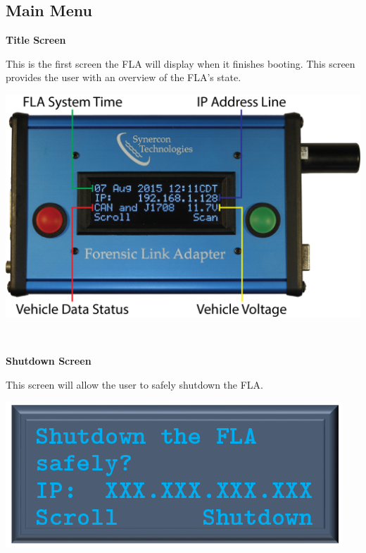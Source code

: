 \documentclass[11pt, oneside]{book}
\begin{document}
\subsection{Main Menu}
\vspace{\baselineskip}
\noindent\begin{minipage}{0.45\textwidth}%
	\begin{center}
		\textbf{Title Screen}
	\end{center}
	This is the first screen the FLA will display when it finishes booting. This screen provides the user with an overview of the FLA's state.
\end{minipage}%
\hfill%
\begin{minipage}{0.45\textwidth} 
	\includegraphics[width=\linewidth]{../media/graphics/title_screen_breakout}
\end{minipage}\\[\baselineskip]
\noindent\begin{minipage}{0.45\textwidth}%
	\begin{center}
		\textbf{Shutdown Screen}
	\end{center}
	This screen will allow the user to safely shutdown the FLA.
\end{minipage}%
\hfill%
\begin{minipage}{0.45\textwidth} 
	\includegraphics[width=\linewidth]{../media/pstricks_files/02_shutdown_menu}
\end{minipage}\\[\baselineskip]
\end{document}
